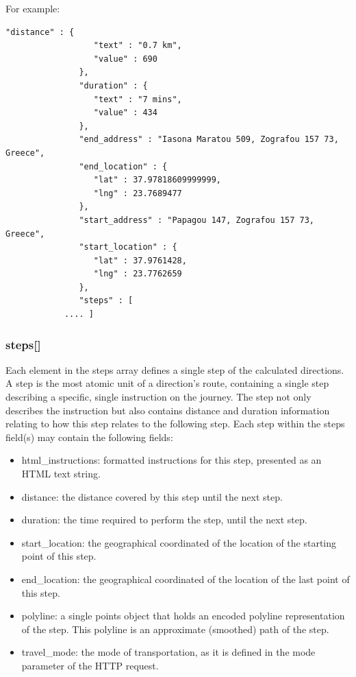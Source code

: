 For example:

\begin{lstlisting}[basicstyle=\footnotesize\ttfamily, breaklines=true]
	      "distance" : {
                  "text" : "0.7 km",
                  "value" : 690
               },
               "duration" : {
                  "text" : "7 mins",
                  "value" : 434
               },
               "end_address" : "Iasona Maratou 509, Zografou 157 73, Greece",
               "end_location" : {
                  "lat" : 37.97818609999999,
                  "lng" : 23.7689477
               },
               "start_address" : "Papagou 147, Zografou 157 73, Greece",
               "start_location" : {
                  "lat" : 37.9761428,
                  "lng" : 23.7762659
               },
               "steps" : [
		    .... ]
\end{lstlisting}

\subsubsection{steps[]}

Each element in the steps array defines a single step of the calculated directions. A step is the most 
atomic unit of a direction's route, containing a single step describing a specific, single instruction on the journey. 
The step not only describes the instruction but also contains distance and duration information relating to how this step relates to the following step. 
Each step within the steps field(s) may contain the following fields:

\begin{itemize}
 \item html\_instructions: formatted instructions for this step, presented as an HTML text string. 
 \item distance: the distance covered by this step until the next step.
 \item duration: the time required to perform the step, until the next step.
 \item start\_location: the geographical coordinated of the location of the starting point of this step.
 \item end\_location: the geographical coordinated of the location of the last point of this step.
 \item polyline: a single points object that holds an encoded polyline representation of the step. This polyline is an approximate (smoothed) path of the step.
 \item travel\_mode: the mode of transportation, as it is defined in the mode parameter of the HTTP request.
\end{itemize}

